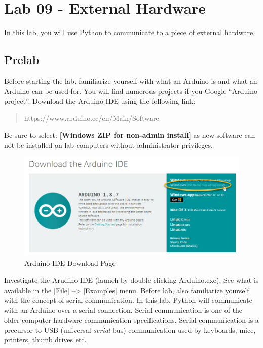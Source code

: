 \documentclass[11pt]{article}
\begin{document}
    
    \hypertarget{lab-09---external-hardware}{%
\section{Lab 09 - External Hardware}\label{lab-09---external-hardware}}

    In this lab, you will use Python to communicate to a piece of external
hardware.

    \hypertarget{prelab}{%
\subsection{Prelab}\label{prelab}}

Before starting the lab, familiarize yourself with what an Arduino is
and what an Arduino can be used for. You will find numerous projects if
you Google ``Arduino project''. Download the Arduino IDE using the
following link:

\begin{quote}
https://www.arduino.cc/en/Main/Software
\end{quote}

Be sure to select: \textbf{{[}Windows ZIP for non-admin install{]}} as
new software can not be installed on lab computers without administrator
privileges.

\begin{figure}[H]
\centering
\includegraphics{images/arduino_download_page.png}
\caption{Arduino IDE Download Page}
\end{figure}

Investigate the Arudino IDE (launch by double clicking Arduino.exe). See
what is available in the {[}File{]} --\textgreater{} {[}Examples{]}
menu. Before lab, also familiarize yourself with the concept of serial
communication. In this lab, Python will communicate with an Arduino over
a serial connection. Serial communication is one of the older computer
hardware communication specifications. Serial communication is a
precursor to USB (universal \emph{serial} bus) communication used by
keyboards, mice, printers, thumb drives etc.
\end{document}
